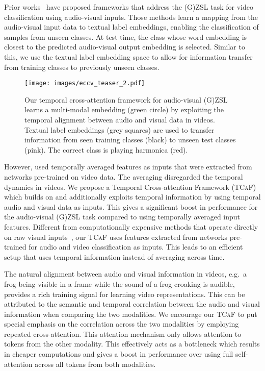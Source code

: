 \documentclass[runningheads]{llncs}
\newcommand{\modelName}{\textsc{TCaF}\xspace}
\begin{document}
Prior works~\cite{parida2020coordinated,mazumder2021avgzslnet,mercea2022} have proposed frameworks that address the (G)ZSL task for video classification using audio-visual inputs. Those methods learn a mapping from the audio-visual input data to textual label embeddings, enabling the classification of samples from unseen classes. At test time, the class whose word embedding is closest to the predicted audio-visual output embedding is selected. Similar to this, we use the textual label embedding space to allow for information transfer from training classes to previously unseen classes.
\begin{wrapfigure}{r}{0.65\linewidth}
\centering
\texttt{[image: images/eccv\_teaser\_2.pdf]}
\caption{Our temporal cross-attention framework for audio-visual (G)ZSL learns a multi-modal embedding (green circle) by exploiting the temporal alignment between audio and visual data in videos. Textual label embeddings (grey squares) are used to transfer information from seen training classes (black) to unseen test classes (pink). The correct class is playing harmonica (red).}
    \label{fig:teaser}
\end{wrapfigure}
 However, \cite{parida2020coordinated,mazumder2021avgzslnet,mercea2022} used temporally averaged features as inputs that were extracted from networks pre-trained on video data. The averaging disregarded the temporal dynamics in videos.
We propose a Temporal Cross-attention Framework (\modelName) which builds on \cite{mercea2022} and additionally exploits temporal information by using temporal audio and visual data as inputs. This gives a significant boost in performance for the audio-visual (G)ZSL task compared to using temporally averaged input features. Different from computationally expensive methods that operate directly on raw visual inputs~\cite{brattoli2020rethinking,lin2022cross,kerrigan2021reformulating}, our \modelName uses features extracted from networks pre-trained for audio and video classification as inputs. This leads to an efficient setup that uses temporal information instead of averaging across time.


The natural alignment between audio and visual information in videos, e.g.\
a frog being visible in a frame while the sound of a frog croaking is audible, provides a rich training signal for learning video representations. This can be attributed to the semantic and temporal correlation between the audio and visual information when comparing the two modalities. We encourage our \modelName to put special emphasis on the correlation across the two modalities by employing repeated cross-attention. This attention mechanism only allows attention to tokens from the other modality. This effectively acts as a bottleneck which results in cheaper computations and gives a boost in performance over using full self-attention across all tokens from both modalities.
\end{document}
